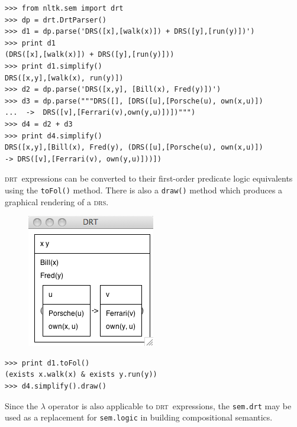 \documentclass[11pt,a4paper]{article}
\newcommand{\DRS}{\textsc{drs}}
\newcommand{\DRT}{\textsc{drt}}
\newcommand{\dhgcode}[1]{{\tt #1}}
\begin{document}
\begin{verbatim}
>>> from nltk.sem import drt
>>> dp = drt.DrtParser()
>>> d1 = dp.parse('DRS([x],[walk(x)]) + DRS([y],[run(y)])')
>>> print d1
(DRS([x],[walk(x)]) + DRS([y],[run(y)]))
>>> print d1.simplify()
DRS([x,y],[walk(x), run(y)])
>>> d2 = dp.parse('DRS([x,y], [Bill(x), Fred(y)])')
>>> d3 = dp.parse("""DRS([], [DRS([u],[Porsche(u), own(x,u)])
...  ->  DRS([v],[Ferrari(v),own(y,u)])])""")
>>> d4 = d2 + d3
>>> print d4.simplify()
DRS([x,y],[Bill(x), Fred(y), (DRS([u],[Porsche(u), own(x,u)]) 
-> DRS([v],[Ferrari(v), own(y,u)]))])
\end{verbatim}

\noindent
\DRT\ expressions can be converted to their first-order predicate
logic equivalents using the \dhgcode{toFol()} method. There is also a
\texttt{draw()} method which produces a graphical rendering of a \DRS.
\hfill\\
\begin{figure}
\includegraphics[scale=.5]{drs.png}
\end{figure}

\begin{verbatim}
>>> print d1.toFol()
(exists x.walk(x) & exists y.run(y))
>>> d4.simplify().draw()
\end{verbatim}






Since the $\lambda$ operator is also applicable to \DRT\ expressions,
the \dhgcode{sem.drt} may be used as a replacement for
\dhgcode{sem.logic} in building compositional semantics.

\clearpage
\end{document}
